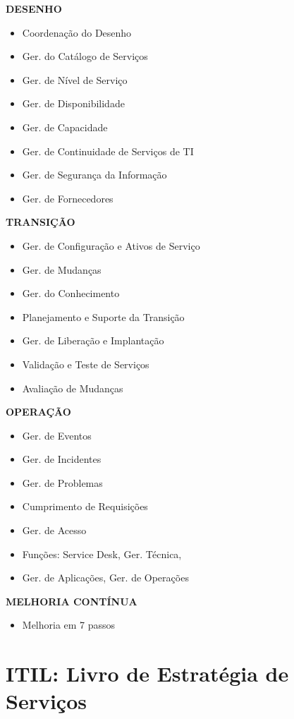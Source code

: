 \textbf{DESENHO}
\begin{itemize}
	\item Coordenação do Desenho
	\item Ger. do Catálogo de Serviços
	\item Ger. de Nível de Serviço
	\item Ger. de Disponibilidade
	\item Ger. de Capacidade
	\item Ger. de Continuidade de Serviços de TI
	\item Ger. de Segurança da Informação
	\item Ger. de Fornecedores
\end{itemize}

\textbf{TRANSIÇÃO}
\begin{itemize}
	\item Ger. de Configuração e Ativos de Serviço
	\item Ger. de Mudanças
	\item Ger. do Conhecimento
	\item Planejamento e Suporte da Transição
	\item Ger. de Liberação e Implantação
	\item Validação e Teste de Serviços
	\item Avaliação de Mudanças
\end{itemize}

\textbf{OPERAÇÃO}
\begin{itemize}
	\item Ger. de Eventos
	\item Ger. de Incidentes
	\item Ger. de Problemas
	\item Cumprimento de Requisições
	\item Ger. de Acesso
	\item Funções: Service Desk, Ger. Técnica,
	\item Ger. de Aplicações, Ger. de Operações
\end{itemize}

\textbf{MELHORIA CONTÍNUA}
\begin{itemize}
	\item Melhoria em 7 passos
\end{itemize}


\section{ITIL: Livro de Estratégia de Serviços}

